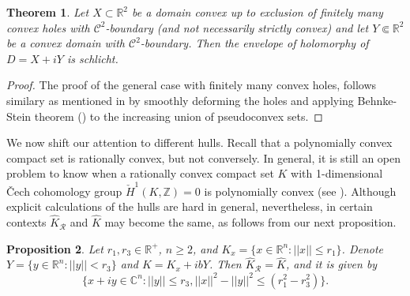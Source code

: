 \documentclass[12pt,reqno, a4paper]{amsart}
\newtheorem{theorem}{Theorem}[section]
\newtheorem{proposition}[theorem]{Proposition}
\theoremstyle{definition}
\theoremstyle{definition}
\numberwithin{equation}{section}
\def\R{\mathbb{R}}                              %
\def\Z{\mathbb{Z}}                              %
\def\C{\mathbb{C}}                              %
\begin{document}
\begin{theorem}\label{schlicht2d}
Let $X\subset\R^2$ be a domain convex up to exclusion of finitely many convex holes with $\mathcal{C}^2$-boundary (and not necessarily strictly convex) and let ${Y\Subset\R^2}$ be a convex domain with $\mathcal{C}^2$-boundary. Then the envelope of holomorphy of $D=X+iY$ is schlicht.
\end{theorem}
\begin{proof}
The proof of the general case with finitely many convex holes, follows similary as mentioned in \cite[Page 2991]{haz-por} by smoothly deforming the holes and applying Behnke-Stein theorem (\cite{beh-ste}) to the increasing union of pseudoconvex sets.
\end{proof}

We now shift our attention to different hulls. Recall that a polynomially convex compact set is rationally convex, but not conversely. In general, it is still an open problem to know when a rationally convex compact set $K$ with 1-dimensional \v Cech cohomology group $\check{H}^1(K,\Z)=0$ is polynomially convex (see \cite[Question II.7]{stol2}). Although explicit calculations of the hulls are hard in general, nevertheless, in certain contexts $\widehat{K}_{\mathcal{R}}$ and $\widehat{K}$ may become the same, as follows from our next proposition.  

\begin{proposition}\label{both_hull_same}
	Let $r_1,r_3\in \R^+$, $n\geq 2$, and $K_x=\{x\in \R^n: ||x||\leq r_1\}$. Denote $Y=\{y\in \R^n: ||y||<r_3\}$  and $K=K_x+ibY$.  Then $\widehat{K}_{\mathcal{R}}=\widehat{K}$, and it is given by $$\big\{x+iy\in \C^n: ||y||\leq r_3, ||x||^2-||y||^2\leq (r_1^2-r_3^2)\big\}.$$
\end{proposition}
\end{document}
